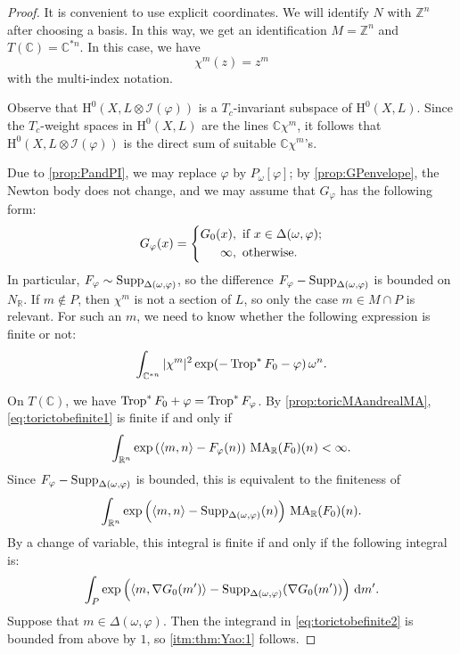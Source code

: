 \begin{proof}
    It is convenient to use explicit coordinates. We will identify $N$ with $\mathbb{Z}^n$ after choosing a basis. In this way, we get an identification $M=\mathbb{Z}^n$ and $T(\mathbb{C})=\mathbb{C}^{*n}$. In this case, we have
    \[
    \chi^m(z)=z^m
    \]
    with the multi-index notation.

    Observe that $\mathrm{H}^0(X,L\otimes \mathcal{I}(\varphi))$ is a $T_c$-invariant subspace of $\mathrm{H}^0(X,L)$. Since the $T_c$-weight spaces in $\mathrm{H}^0(X,L)$ are the lines $\mathbb{C}\chi^m$, it follows that $\mathrm{H}^0(X,L\otimes \mathcal{I}(\varphi))$ is the direct sum of suitable $\mathbb{C}\chi^m$'s.

    Due to \cref{prop:PandPI}, we may replace $\varphi$ by $P_{\omega}[\varphi]$; by \cref{prop:GPenvelope}, the Newton body does not change, and we may assume that $G_{\varphi}$ has the following form:
    \[
    G_{\varphi}(x)=
    \left\{
    \begin{aligned}
        G_0(x)&,\textup{ if } x\in \Delta(\omega,\varphi);\\
        \infty&,\textup{ otherwise}.
    \end{aligned}
    \right.
    \]
    In particular, $F_{\varphi}\sim \operatorname{Supp}_{\Delta(\omega,\varphi)}$, so the difference $F_{\varphi}-\operatorname{Supp}_{\Delta(\omega,\varphi)}$ is bounded on $N_{\mathbb{R}}$.
    If $m\notin P$, then $\chi^m$ is not a section of $L$, so only the case $m\in M\cap P$ is relevant. For such an $m$, we need to know whether the following expression is finite or not:
    \begin{equation}\label{eq:torictobefinite1}
        \int_{\mathbb{C}^{*n}} |\chi^{m}|^2  \exp(-\operatorname{Trop}^* F_0-\varphi)\,\omega^n.
    \end{equation}

    On $T(\mathbb{C})$, we have $\operatorname{Trop}^*F_0+\varphi=\operatorname{Trop}^*F_{\varphi}$. By \cref{prop:toricMAandrealMA}, \eqref{eq:torictobefinite1} is finite if and only if
    \[
    \int_{\mathbb{R}^n} \exp\left(\langle m,n \rangle-F_{\varphi}(n)\right)\,\operatorname{MA}_{\mathbb{R}}(F_0)(n)<\infty.
    \]
    Since $F_{\varphi}-\operatorname{Supp}_{\Delta(\omega,\varphi)}$ is bounded, this is equivalent to the finiteness of
    \[
    \int_{\mathbb{R}^n} \exp\left(\langle m,n \rangle-\operatorname{Supp}_{\Delta(\omega,\varphi)}(n)\right)\,\operatorname{MA}_{\mathbb{R}}(F_0)(n).
    \]
    By a change of variable, this integral is finite if and only if the following integral is:
    \begin{equation}\label{eq:torictobefinite2}
    \int_P \exp\left(\langle m,\nabla G_0(m') \rangle-\operatorname{Supp}_{\Delta(\omega,\varphi)}(\nabla G_0(m'))\right)\,\mathrm{d}m'.
    \end{equation}
    Suppose that $m\in \Delta(\omega,\varphi)$. Then the integrand in \eqref{eq:torictobefinite2} is bounded from above by $1$, so \ref{itm:thm:Yao:1} follows.



\end{proof}
